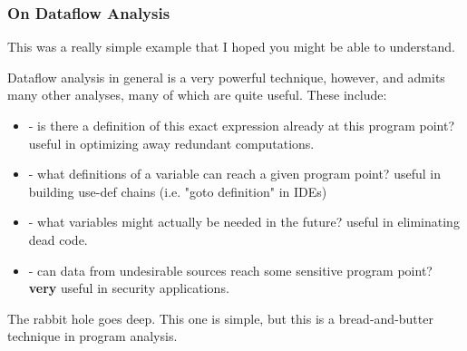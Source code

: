 \documentclass[aspectratio=169, handout]{beamer}
\begin{document}
 \begin{frame}[fragile]
   \frametitle{On Dataflow Analysis}

   This was a really simple example that I hoped you might be able to understand.

   \pause
   \vspace{\fill}

   Dataflow analysis in general is a very powerful technique, however, and admits
   many other analyses, many of which are quite useful. These include:
   \pause
   \begin{itemize}
     \item {} - is there a definition of this exact
     expression already at this program point? useful in optimizing away
     redundant computations. \pause
     \item {} - what definitions of a variable can
     reach a given program point? useful in building use-def chains (i.e.
     "goto definition" in IDEs) \pause
     \item {} - what variables might actually be needed
     in the future? useful in eliminating dead code. \pause
     \item {} - can data from undesirable sources reach
     some sensitive program point? \textbf{very} useful in security applications.
   \end{itemize}

   \pause
   \vspace{\fill}

   The rabbit hole goes deep. This one is simple, but this is a bread-and-butter
   technique in program analysis.
 \end{frame}
\end{document}
